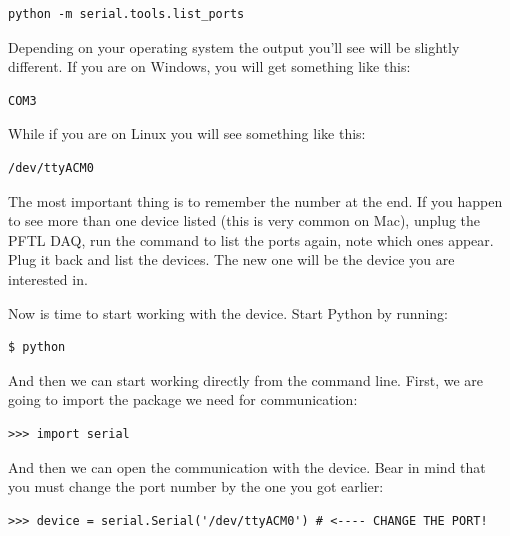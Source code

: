 \begin{verbatim}
python -m serial.tools.list_ports
\end{verbatim}


Depending on your operating system the output you'll see will be slightly different. If you are on Windows, you will get something like this:

\begin{verbatim}
COM3
\end{verbatim}

While if you are on Linux you will see something like this:

\begin{verbatim}
/dev/ttyACM0
\end{verbatim}

The most important thing is to remember the number at the end. If you happen to see more than one device listed (this is very common on Mac), unplug the {PFTL DAQ}, run the command to list the ports again, note which ones appear. Plug it back and list the devices. The new one will be the device you are interested in. 

Now is time to start working with the device. Start Python by running:

\begin{verbatim}
$ python
\end{verbatim}

And then we can start working directly from the command line. First, we are going to import the package we need for communication:

\begin{verbatim}
>>> import serial
\end{verbatim}


And then we can open the communication with the device. Bear in mind that you must change the port number by the one you got earlier:

\begin{verbatim}
>>> device = serial.Serial('/dev/ttyACM0') # <---- CHANGE THE PORT!
\end{verbatim}

